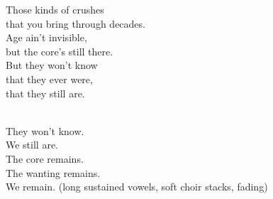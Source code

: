 \begin{lyrics}
Those kinds of crushes\\
that you bring through decades.\\
Age ain’t invisible,\\
but the core’s still there.\\
But they won’t know\\
that they ever were,\\
that they still are.

\\
They won’t know.\\
We still are.\\
The core remains.\\
The wanting remains.\\
We remain.
(long sustained vowels, soft choir stacks, fading)
\end{lyrics}

